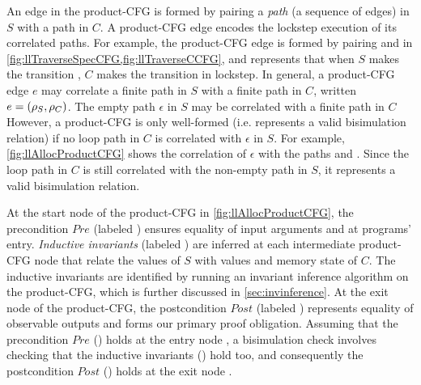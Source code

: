 An edge in the product-CFG is formed by pairing a {\em path} (a sequence of edges) in $S$
with a path in $C$.
A product-CFG edge encodes the lockstep execution of its correlated paths.
For example, the product-CFG edge  is formed by pairing
 and  in \cref{fig:llTraverseSpecCFG,fig:llTraverseCCFG},
and represents that when $S$ makes the transition , $C$ makes the transition 
in lockstep.
In general, a product-CFG edge $e$ may correlate a finite path \sv{\rho} in $S$ with a finite path
\cv{\rho} in $C$, written $e=({\tt \rho}_{S},{\tt \rho}_{C})$.
The empty path $\epsilon$ in $S$ may be correlated with a finite path in $C$
However, a product-CFG is only well-formed (i.e. represents a valid bisimulation relation)
if no loop path in $C$ is correlated with $\epsilon$ in $S$.
For example, \cref{fig:llAllocProductCFG} shows the correlation of
$\epsilon$ with the paths  and .
Since the loop path  in $C$ is still correlated with
the non-empty path  in $S$, it represents a valid bisimulation relation.

At the start node  of the product-CFG in \cref{fig:llAllocProductCFG},
the precondition $Pre$ (labeled )
ensures equality of input arguments  and  at programs' entry.
{\em Inductive invariants} (labeled ) are inferred
at each intermediate product-CFG node that relate
the values of $S$ with values and memory state of $C$.
The inductive invariants are identified by running an invariant inference algorithm
on the product-CFG, which is further discussed in \cref{sec:invinference}.
At the exit node  of the product-CFG, the postcondition $Post$ (labeled )
represents equality of observable outputs and forms our primary proof obligation.
Assuming that the precondition $Pre$ () holds at the entry node ,
a bisimulation check involves checking that the inductive invariants () hold too,
and consequently the postcondition $Post$ () holds at the exit node .

